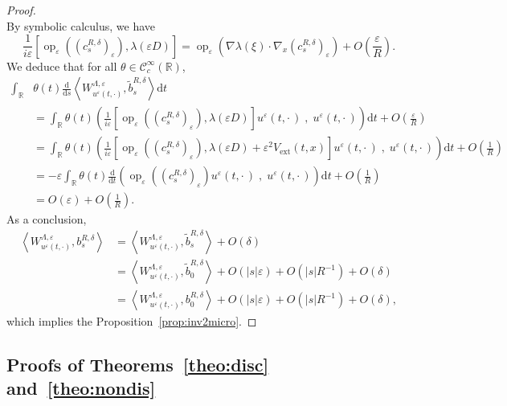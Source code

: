\documentclass[10pt]{amsart}
\theoremstyle{definition}
\DeclareMathOperator{\ext}{ext}
\DeclareMathOperator{\op}{op}
\newcommand*\R{{\mathbb R}}
\newcommand*\eps{\varepsilon}
\numberwithin{equation}{section}
\newcommand*{\dd}{\mathrm{d}}
\newcommand*{\dt}{\dd t}
\newcommand*{\ds}{\dd s}
\begin{document}
\begin{proof}
\[\]
By symbolic calculus, we have
\[
\frac{1}{i\eps} \left[\op_\eps((c^{R,\delta}_s)_\eps),\lambda(\eps D)\right] = \op_\eps\left(\nabla\lambda(\xi) \cdot \nabla_x (c^{R,\delta}_s)_\eps\right)+O\left(\frac{\eps}{R}\right).
\]
We deduce that for all $\theta\in{\mathcal C}_c^\infty(\R)$,
\begin{align*}
\int_\R &\theta(t) \frac{\dd}{\ds} \left\langle W_{u^\eps(t,\cdot)}^{\Lambda,\eps}, \widetilde b^{R,\delta}_s\right\rangle \dt \\
&= \int _\R\theta(t) \left(\frac{1}{i\eps} \left[\op_\eps((c^{R,\delta}_s)_\eps),\lambda(\eps D)\right] u^\eps(t,\cdot\,)\;,\;u^\eps(t,\cdot\,) \right) \dt +O\left(\frac{\eps}{R}\right)\\
&= \int _\R\theta(t) \left(\frac{1}{i\eps} \left[\op_\eps((c^{R,\delta}_s)_\eps),\lambda(\eps D)+\eps^2 V_{\ext}(t,x)\right] u^\eps(t,\cdot\,)\;,\;u^\eps(t,\cdot\,) \right) \dt +\!O\!\left(\frac{1}{R}\right)\\
&=-\eps \int _\R\theta(t) \frac{\dd}{\dt} \left(\op_\eps((c^{R,\delta}_s)_\eps) u^\eps(t,\cdot\,)\;,\;u^\eps(t,\cdot\,) \right) \dt +O\left(\frac{1}{R}\right)\\
&= O(\eps)+O\left(\frac{1}{R}\right).
\end{align*}
As a conclusion,
\begin{align*}
\left\langle W_{u^\eps(t,\cdot)}^{\Lambda,\eps}, b^{R,\delta}_s \right\rangle& = \left\langle W_{u^\eps(t,\cdot)}^{\Lambda,\eps}, \widetilde b^{R,\delta}_s\right\rangle +O(\delta)\\
& = \left\langle W_{u^\eps(t,\cdot)}^{\Lambda,\eps}, \widetilde b^{R,\delta}_0\right\rangle + O(|s|\eps)+O(|s| R^{-1}) + O(\delta)\\
& = \left\langle W_{u^\eps(t,\cdot)}^{\Lambda,\eps}, b^{R,\delta}_0\right\rangle + O(|s|\eps)+O(|s| R^{-1}) + O(\delta),
\end{align*}
which implies the Proposition~\ref{prop:inv2micro}.
\end{proof}



\subsection{Proofs of Theorems~\ref{theo:disc} and~\ref{theo:nondis}}
\end{document}
